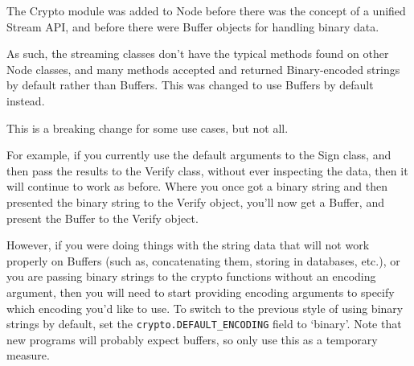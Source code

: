 The Crypto module was added to Node before there was the concept of a
unified Stream API, and before there were Buffer objects for handling
binary data.

As such, the streaming classes don't have the typical methods found on
other Node classes, and many methods accepted and returned
Binary-encoded strings by default rather than Buffers. This was changed
to use Buffers by default instead.

This is a breaking change for some use cases, but not all.

For example, if you currently use the default arguments to the Sign
class, and then pass the results to the Verify class, without ever
inspecting the data, then it will continue to work as before. Where you
once got a binary string and then presented the binary string to the
Verify object, you'll now get a Buffer, and present the Buffer to the
Verify object.

However, if you were doing things with the string data that will not
work properly on Buffers (such as, concatenating them, storing in
databases, etc.), or you are passing binary strings to the crypto
functions without an encoding argument, then you will need to start
providing encoding arguments to specify which encoding you'd like to
use. To switch to the previous style of using binary strings by default,
set the \texttt{crypto.DEFAULT\_ENCODING} field to `binary'. Note that
new programs will probably expect buffers, so only use this as a
temporary measure.
